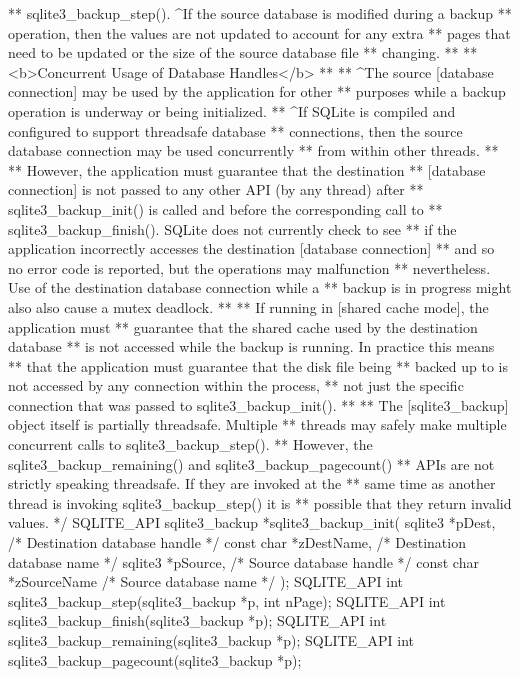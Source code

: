 \begin{Codex}[label=sqlite3.h,numbers=left]
{** sqlite3_backup_step(). ^If the source database is modified during a backup
** operation, then the values are not updated to account for any extra
** pages that need to be updated or the size of the source database file
** changing.
**
** <b>Concurrent Usage of Database Handles</b>
**
** ^The source [database connection] may be used by the application for other
** purposes while a backup operation is underway or being initialized.
** ^If SQLite is compiled and configured to support threadsafe database
** connections, then the source database connection may be used concurrently
** from within other threads.
**
** However, the application must guarantee that the destination 
** [database connection] is not passed to any other API (by any thread) after 
** sqlite3_backup_init() is called and before the corresponding call to
** sqlite3_backup_finish().  SQLite does not currently check to see
** if the application incorrectly accesses the destination [database connection]
** and so no error code is reported, but the operations may malfunction
** nevertheless.  Use of the destination database connection while a
** backup is in progress might also also cause a mutex deadlock.
**
** If running in [shared cache mode], the application must
** guarantee that the shared cache used by the destination database
** is not accessed while the backup is running. In practice this means
** that the application must guarantee that the disk file being 
** backed up to is not accessed by any connection within the process,
** not just the specific connection that was passed to sqlite3_backup_init().
**
** The [sqlite3_backup] object itself is partially threadsafe. Multiple 
** threads may safely make multiple concurrent calls to sqlite3_backup_step().
** However, the sqlite3_backup_remaining() and sqlite3_backup_pagecount()
** APIs are not strictly speaking threadsafe. If they are invoked at the
** same time as another thread is invoking sqlite3_backup_step() it is
** possible that they return invalid values.
*/
SQLITE_API sqlite3_backup *sqlite3_backup_init(
  sqlite3 *pDest,                        /* Destination database handle */
  const char *zDestName,                 /* Destination database name */
  sqlite3 *pSource,                      /* Source database handle */
  const char *zSourceName                /* Source database name */
);
SQLITE_API int sqlite3_backup_step(sqlite3_backup *p, int nPage);
SQLITE_API int sqlite3_backup_finish(sqlite3_backup *p);
SQLITE_API int sqlite3_backup_remaining(sqlite3_backup *p);
SQLITE_API int sqlite3_backup_pagecount(sqlite3_backup *p);

}
\end{Codex}
